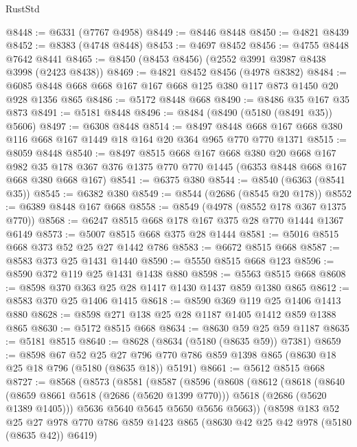 \begin{lexlean}{RustStd}
\begin{coremodule}
@8448 := @6331 (@7767 @4958)
@8449 := @8446 @8448
@8450 := @4821 @8439
@8452 := @8383 (@4748 @8448)
@8453 := @4697 @8452
@8456 := @4755 @8448 @7642 @8441
@8465 := @8450 (@8453 @8456) (@2552 @3991 @3987 @8438 @3998 (@2423 @8438))
@8469 := @4821 @8452 @8456 (@4978 @8382)
@8484 := @6085 @8448 @668 @668 @167 @167 @668 @125 @380 @117 @873 @1450 @20 @928 @1356 @865
@8486 := @5172 @8448 @668
@8490 := @8486 @35 @167 @35 @873
@8491 := @5181 @8448
@8496 := @8484 (@8490 (@5180 (@8491 @35)) @5606)
@8497 := @6308 @8448
@8514 := @8497 @8448 @668 @167 @668 @380 @116 @668 @167 @1449 @18 @164 @20 @364 @965 @770 @770 @1371
@8515 := @8059 @8448
@8540 := @8497
    @8515
    @668
    @167
    @668
    @380
    @20
    @668
    @167
    @982
    @35
    @178
    @367
    @376
    @1375
    @770
    @770
    @1445
    (@6353 @8448 @668 @167 @668 @380 @668 @167)
@8541 := @6375 @380
@8544 := @8540 (@6363 (@8541 @35))
@8545 := @6382 @380
@8549 := @8544 (@2686 (@8545 @20 @178))
@8552 := @6389 @8448 @167 @668
@8558 := @8549 (@4978 (@8552 @178 @367 @1375 @770))
@8568 := @6247 @8515 @668 @178 @167 @375 @28 @770 @1444 @1367 @6149
@8573 := @5007 @8515 @668 @375 @28 @1444
@8581 := @5016 @8515 @668 @373 @52 @25 @27 @1442 @786
@8583 := @6672 @8515 @668
@8587 := @8583 @373 @25 @1431 @1440
@8590 := @5550 @8515 @668 @123
@8596 := @8590 @372 @119 @25 @1431 @1438 @880
@8598 := @5563 @8515 @668
@8608 := @8598 @370 @363 @25 @28 @1417 @1430 @1437 @859 @1380 @865
@8612 := @8583 @370 @25 @1406 @1415
@8618 := @8590 @369 @119 @25 @1406 @1413 @880
@8628 := @8598 @271 @138 @25 @28 @1187 @1405 @1412 @859 @1388 @865
@8630 := @5172 @8515 @668
@8634 := @8630 @59 @25 @59 @1187
@8635 := @5181 @8515
@8640 := @8628 (@8634 (@5180 (@8635 @59)) @7381)
@8659 := @8598
    @67
    @52
    @25
    @27
    @796
    @770
    @786
    @859
    @1398
    @865
    (@8630 @18 @25 @18 @796 (@5180 (@8635 @18)) @5191)
@8661 := @5612 @8515 @668
@8727 := @8568
    (@8573
      (@8581
        (@8587
          (@8596
            (@8608
              (@8612
                (@8618
                  (@8640
                    (@8659 @8661 @5618 (@2686 (@5620 @1399 @770)))
                    @5618
                    (@2686 (@5620 @1389 @1405)))
                  @5636
                  @5640
                  @5645
                  @5650
                  @5656
                  @5663))
              (@8598
                @183
                @52
                @25
                @27
                @978
                @770
                @786
                @859
                @1423
                @865
                (@8630 @42 @25 @42 @978 (@5180 (@8635 @42)) @6419)

\end{coremodule}
\end{lexlean}
